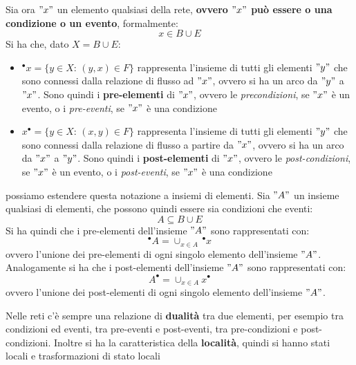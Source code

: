 \begin{definizione}
\begin{definizione}
  Sia ora $"x"$ un elemento qualsiasi della rete, \textbf{ovvero $"x"$ può essere o una
  condizione o un evento}, formalmente:
  \[x\in B\cup E\]
  Si ha che, dato $X=B\cup E$:
  \begin{itemize}
    \item $^\bullet x=\{y\in X:\,(y, x)\in F\}$ rappresenta l'insieme di tutti gli
    elementi $"y"$ che sono connessi dalla relazione di flusso ad $"x"$, ovvero si
    ha un arco da $"y"$ a $"x"$. Sono quindi i \textbf{pre-elementi} di $"x"$, ovvero
    le \textit{precondizioni}, se $"x"$ è un evento, o i \textit{pre-eventi}, se
    $"x"$ è una condizione
    \item $x^\bullet=\{y\in X:\,(x, y)\in F\}$ rappresenta l'insieme di tutti gli
    elementi $"y"$ che sono connessi dalla relazione di flusso a partire da $"x"$,
    ovvero si ha un arco da $"x"$ a $"y"$. Sono quindi i \textbf{post-elementi} di
    $"x"$, ovvero le \textit{post-condizioni}, se $"x"$ è un evento, o i
    \textit{post-eventi}, se $"x"$ è una condizione
  \end{itemize}
  
  \end{definizione} \vspace{5mm} %
  \begin{corollario}
     possiamo estendere questa notazione a insiemi di elementi. Sia $"A"$ un insieme
  qualsiasi di elementi, che possono quindi essere sia condizioni che eventi:
  \[A\subseteq B\cup E\]
  Si ha quindi che i pre-elementi dell'insieme $"A"$ sono rappresentati con:
  \[^\bullet A=\cup_{x\in A}\, ^\bullet x\]
  ovvero l'unione dei pre-elementi di ogni singolo elemento dell'insieme $"A"$.\\
  Analogamente si ha che i post-elementi dell'insieme $"A"$ sono rappresentati
  con: 
  \[A^\bullet=\cup_{x\in A} x^\bullet\]
  ovvero l'unione dei post-elementi di ogni singolo elemento dell'insieme $"A"$.
    \end{corollario}
  \begin{nota}
  Nelle reti c'è sempre una relazione di \textbf{dualità} tra due
    elementi, per esempio tra condizioni ed eventi, tra pre-eventi e
    post-eventi, tra pre-condizioni e post-condizioni. Inoltre si ha la
    caratteristica della \textbf{località}, quindi si hanno stati locali e
    trasformazioni di stato locali
  \end{nota}
\end{definizione} \vspace{5mm} %
